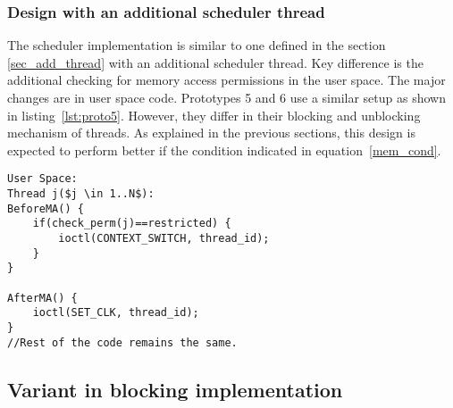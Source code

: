 \subsubsection{Design with an additional scheduler thread}

The scheduler implementation is similar to one defined in the section \ref{sec_add_thread} with an additional scheduler thread. 
Key difference is the additional checking for memory access permissions in the user space. 
The major changes are in user space code. 
Prototypes 5 and 6 use a similar setup as shown in listing~\ref{lst:proto5}. 
However, they differ in their blocking and unblocking mechanism of threads. 
As explained in the previous sections, this design is expected to perform better if the condition indicated in  equation~\ref{mem_cond}.
\begin{lstlisting}[mathescape=true,caption={Pseudo Code for Prototype 5 and 6}, style=customc,frame=tlrb,label={lst:proto5}]
User Space:
Thread j($j \in 1..N$):
BeforeMA() {	
	if(check_perm(j)==restricted) {
		ioctl(CONTEXT_SWITCH, thread_id);	
	}
}

AfterMA() {	
	ioctl(SET_CLK, thread_id);
}
//Rest of the code remains the same.
\end{lstlisting}
\subsection{Variant in blocking implementation}

